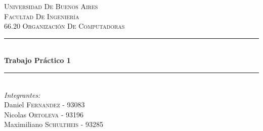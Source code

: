 \documentclass{article}
\begin{document}
 
\begin{titlepage}

\newcommand{\HRule}{\rule{\linewidth}{0.5mm}} %

\center %
 

\textsc{\LARGE Universidad De Buenos Aires}\\[1.5cm] %
\textsc{\Large Facultad De Ingeniería}\\[0.5cm] %
\textsc{\large 66.20 Organización De Computadoras}\\[0.5cm] %


\HRule \\[0.4cm]
{ \huge \bfseries Trabajo Práctico 1}\\[0.4cm] %
\HRule \\[1.5cm]
 

\Large \emph{Integrantes:}\\
Daniel \textsc{Fernandez} - 93083\\ %
Nicolas \textsc{Ortoleva} - 93196\\ %
Maximiliano \textsc{Schultheis} - 93285\\[5cm] %



\end{titlepage}
\end{document}
